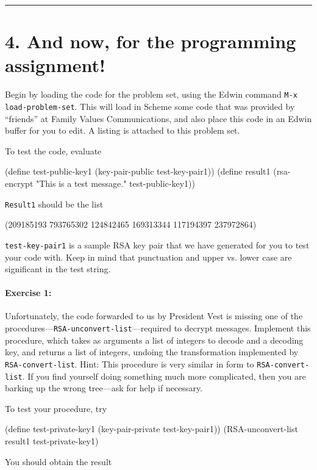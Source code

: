 \rule{6.5 in}{0.5 pt}

\vfill
\newpage

\section{4. And now, for the programming assignment!}

Begin by loading the code for the problem set, using the Edwin command
{\tt M-x load-problem-set}.  This will load in Scheme some code that
was provided by ``friends'' at Family Values Communications, and also
place this code in an Edwin buffer for you to edit.  A listing is
attached to this problem set.

To test the code, evaluate

\beginlisp
(define test-public-key1 (key-pair-public test-key-pair1))
(define result1 (rsa-encrypt "This is a test message." test-public-key1))
\endlisp

\noindent
{\tt Result1} should be the list

\beginlisp
(209185193 793765302 124842465 169313344 117194397 237972864)
\endlisp

\noindent
{\tt test-key-pair1} is a sample RSA key pair that we have
generated for you to test your code with.  Keep in mind that punctuation
and upper vs. lower case are significant in the test string.

\paragraph{Exercise 1:}
Unfortunately, the code forwarded to us by President Vest is missing
one of the procedures---{\tt RSA-unconvert-list}---required to decrypt
messages.  Implement this procedure, which takes as arguments a list
of integers to decode and a decoding key, and returns a list of
integers, undoing the transformation implemented by {\tt
RSA-convert-list}.  Hint: This procedure is very similar in form to
{\tt RSA-convert-list}.  If you find yourself doing something much
more complicated, then you are barking up the wrong tree---ask 
for help if necessary.

To test your procedure, try

\beginlisp
(define test-private-key1 (key-pair-private test-key-pair1))
\null
(RSA-unconvert-list result1 test-private-key1)
\endlisp

\noindent
You should obtain the result

